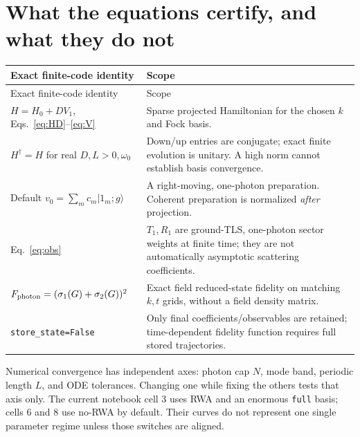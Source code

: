 \documentclass[11pt,a4paper]{article}
\newcommand{\ket}[1]{\lvert #1\rangle}
\newcommand{\code}[1]{\nolinkurl{#1}}
\begin{document}
\section{What the equations certify, and what they do not}
\begin{center}\small
\begin{longtable}{p{}p{}}
\toprule Exact finite-code identity & Scope\\\midrule\endfirsthead
\toprule Exact finite-code identity & Scope\\\midrule\endhead
$H=H_0+D V_1$, Eqs.~\eqref{eq:HD}--\eqref{eq:V} & Sparse projected Hamiltonian for the chosen $k$ and Fock basis.\\
$H^\dagger=H$ for real $D,L>0,\omega_0$ & Down/up entries are conjugate; exact finite evolution is unitary. A high norm cannot establish basis convergence.\\
Default $v_0=\sum_m c_m\ket{1_m;g}$ & A right-moving, one-photon preparation. Coherent preparation is normalized \emph{after} projection.\\
Eq.~\eqref{eq:obs} & $T_1,R_1$ are ground-TLS, one-photon sector weights at finite time; they are not automatically asymptotic scattering coefficients.\\
$F_{\rm photon}=(\sigma_1(G)+\sigma_2(G))^2$ & Exact field reduced-state fidelity on matching $k,t$ grids, without a field density matrix.\\
\code{store_state=False} & Only final coefficients/observables are retained; time-dependent fidelity function requires full stored trajectories.\\
\bottomrule
\end{longtable}
\end{center}
Numerical convergence has independent axes: photon cap $N$, mode band,
periodic length $L$, and ODE tolerances. Changing one while fixing the others
tests that axis only. The current notebook cell 3 uses RWA and an enormous
\code{full} basis; cells 6 and 8 use no-RWA by default. Their curves do not
represent one single parameter regime unless those switches are aligned.
\end{document}
